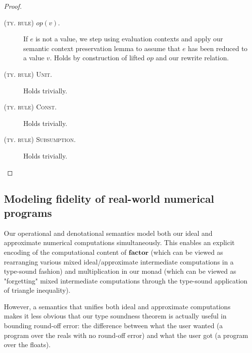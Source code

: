 \begin{proof}
\begin{description}
  \item[\textsc{(ty. rule) $\textit{op}(v)$.}] 
    If $e$ is not a value, we step using evaluation contexts and apply our
    semantic context preservation lemma to assume that $e$ has been reduced to a
    value $v$.
    Holds by construction of lifted $\textit{op}$ and our rewrite relation.
  \item[\textsc{(ty. rule) Unit.}] Holds trivially.
  \item[\textsc{(ty. rule) Const.}] Holds trivially.
  \item[\textsc{(ty. rule) Subsumption.}] Holds trivially.
\end{description}
\end{proof}

\subsection{Modeling fidelity of real-world numerical programs}
Our operational and denotational semantics model both our ideal and approximate
numerical computations simultaneously. This enables an explicit encoding of the
computational content of $\textbf{factor}$ (which can be viewed as rearranging
various mixed ideal/approximate intermediate computations in a type-sound
fashion) and multiplication in our monad (which can be viewed as "forgetting"
mixed intermediate computations through the type-sound application of triangle
inequality).

However, a semantics that unifies both ideal and approximate computations makes
it less obvious that our type soundness theorem is actually useful in bounding
round-off error: the difference between what the user wanted (a program over the
reals with no round-off error) and what the user got (a program over the
floats).

